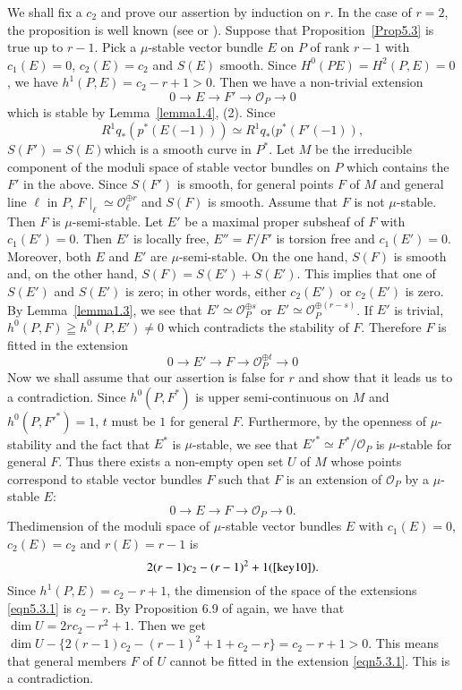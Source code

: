 \begin{Proof}
We shall fix a $c_2$ and prove our assertion by induction on $r$. In
the case of $r=2$, the proposition is well known (see \cite{key2}
or \cite{key11}). Suppose that Proposition~\ref{Prop5.3} is true up to 
$r-1$. Pick a $\mu$-stable vector bundle $E$ on $P$ of rank $r-1$ with
$c_1(E)=0$, $c_2(E)=c_2$ and $S(E)$ smooth. Since $H^{0}(P
E)=H^{2}(P,E)=0$, we have $h^{1}(P,E)=c_2-r+1>0$. Then we have a
non-trivial extension 
$$
0\to E\to F'\to \mathscr{O}_P\to 0
$$
which is stable by Lemma~\ref{lemma1.4}, (2). Since
$$
R^{1}q_{\ast}(p^{\ast}(E(-1)))\simeq R^{1}q_{\ast}(p^{\ast}(F'(-1)),
$$
$S(F')=S(E)$\pageoriginale which is a smooth curve in
$P^{\ast}$. Let $M$ be the irreducible component of the moduli space
of stable vector bundles on 
$P$ which contains the $F'$ in the above. Since $S(F')$ is smooth, for
general points $F$ of $M$ and general line $\ell$ in $P$,
$F\mid_{\ell}\simeq \mathscr{O}_{\ell}^{\oplus r}$ and $S(F)$ is
smooth. Assume that $F$ is not $\mu$-stable. Then $F$ is
$\mu$-semi-stable. Let $E'$ be a maximal proper subsheaf of $F$ with
$c_1(E')=0$. Then $E'$ is locally free, $E''=F/F'$ is torsion
free and $c_1(E')=0$. Moreover, both $E$ and $E'$ are
$\mu$-semi-stable. On the one hand, $S(F)$ is smooth and, on the other
hand, $S(F)=S(E')+S(E')$. This implies that one of $S(E')$ and $S(E')$
is zero; in other words, either $c_2(E')$ or $c_2(E')$ is zero. By
Lemma~\ref{lemma1.3}, we see that $E'\simeq \mathscr{O}_{P}^{\oplus
  s}$ or $E'\simeq \mathscr{O}_{P}^{\oplus(r-s)}$. If $E'$ is trivial,
$h^{0}(P,F)\geqq h^{0}(P,E')\neq 0$ which contradicts the stability of
$F$. Therefore $F$ is fitted in the extension
$$
0\to E'\to F\to \mathscr{O}_P^{\oplus t}\to 0
$$
Now we shall assume that our assertion is false for $r$ and show that
it leads us to a contradiction. Since $h^{0}(P,F^{\ast})$ is upper
semi-continuous on $M$ and $h^{0}(P,{F'}^{\ast})=1$, $t$ must be $1$ for
general $F$. Furthermore, by the openness of $\mu$-stability and the
fact that $E^{\ast}$ is $\mu$-stable, we see that
${E'}^{\ast}\simeq F^{*}/\mathscr{O}_{P}$ is $\mu$-stable for general
$F$. Thus there exists a non-empty open set $U$ of $M$ whose points
correspond to stable vector bundles $F$ such that $F$ is an extension of
$\mathscr{O}_P$ by a $\mu$-stable $E$: 
\setcounter{equation}{0}
\begin{equation}\label{eqn5.3.1}
0\to E\to F\to \mathscr{O}_P\to 0.
\end{equation}
The\pageoriginale dimension of the moduli space of $\mu$-stable vector
bundles $E$ with $c_1(E)=0$, $c_2(E)=c_2$ and $r(E)=r-1$ is 
$$
2(r-1)c_2-(r-1)^{2}+1(\cite[\text{Proposition~}6.9]{key10}).
$$
Since $h^{1}(P,E)=c_2-r+1$, the dimension of the space of the
extensions \eqref{eqn5.3.1} is $c_2-r$. By Proposition 6.9 of
\cite{key10} again, we have that $\dim U=2r c_2-r^{2}+1$. Then we get
$\dim U-\{2(r-1)c_2-(r-1)^{2}+1+c_2-r\}=c_2-r+1>0$. This means that
general members $F$ of $U$ cannot be fitted in the extension
\eqref{eqn5.3.1}. This is a contradiction.
\enprf
\end{Proof}

